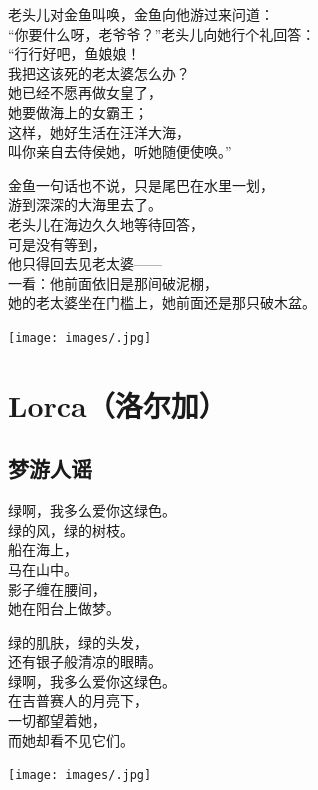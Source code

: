 \documentclass[
]{book}
\renewenvironment{quote}{\begin{VF}}{\end{VF}}
\begin{document}
\begin{quote}
老头儿对金鱼叫唤，金鱼向他游过来问道：\\
``你要什么呀，老爷爷？''老头儿向她行个礼回答：\\
``行行好吧，鱼娘娘！\\
我把这该死的老太婆怎么办？\\
她已经不愿再做女皇了，\\
她要做海上的女霸王；\\
这样，她好生活在汪洋大海，\\
叫你亲自去侍侯她，听她随便使唤。''

金鱼一句话也不说，只是尾巴在水里一划，\\
游到深深的大海里去了。\\
老头儿在海边久久地等待回答，\\
可是没有等到，\\
他只得回去见老太婆------\\
一看：他前面依旧是那间破泥棚，\\
她的老太婆坐在门槛上，她前面还是那只破木盆。
\end{quote}

\texttt{[image: images/.jpg]}

\hypertarget{lorca}{%
\chapter{Lorca（洛尔加）}\label{lorca}}

\hypertarget{section-54}{%
\section{梦游人谣}\label{section-54}}

\begin{quote}
绿啊，我多么爱你这绿色。\\
绿的风，绿的树枝。\\
船在海上，\\
马在山中。\\
影子缠在腰间，\\
她在阳台上做梦。

绿的肌肤，绿的头发，\\
还有银子般清凉的眼睛。\\
绿啊，我多么爱你这绿色。\\
在吉普赛人的月亮下，\\
一切都望着她，\\
而她却看不见它们。
\end{quote}

\texttt{[image: images/.jpg]}
\end{document}

